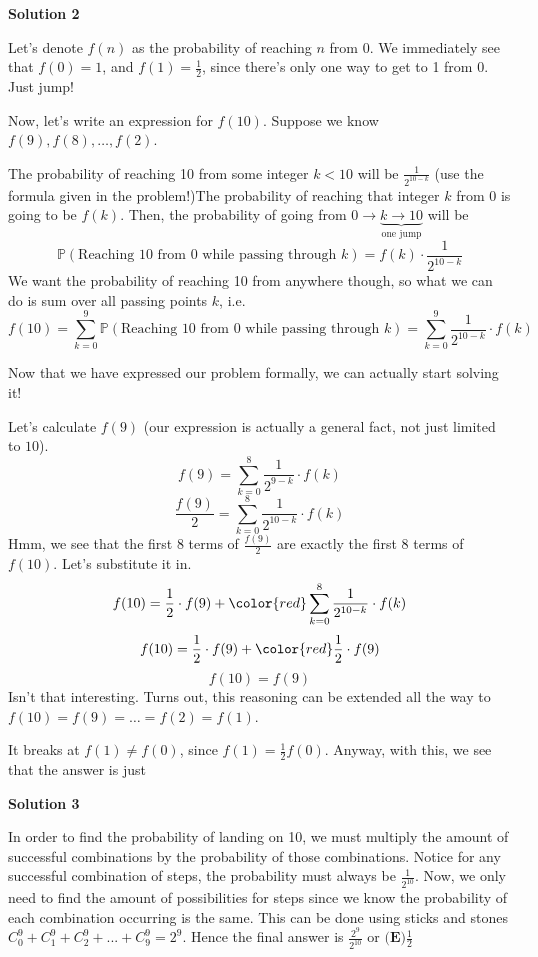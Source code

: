 \begin{enumerate}
 



\textbf{Solution 2}

Let's denote $f(n)$ as the probability of reaching $n$ from $0$. We immediately see that $f(0) = 1$, and $f(1) = \frac{1}{2}$, since there's only one way to get to 1 from 0. Just jump!

 Now, let's write an expression for $f(10)$. Suppose we know $f(9),f(8),\dotsc,f(2)$.  

 The probability of reaching 10 from some integer $k < 10$ will be $\frac{1}{2^{10-k}}$ (use the formula given in the problem!)The probability of reaching that integer $k$ from $0$ is going to be $f(k)$. Then, the probability of going from $0 \to \underbrace{ k \to 10}_{\text{one jump}}$ will be 
 \[\mathbb{P}(\text{Reaching } 10 \text{ from } 0 \text { while passing through } k) = f(k) \cdot \frac{1}{2^{10-k}}\] We want the probability of reaching 10 from anywhere though, so what we can do is sum over all passing points $k$, i.e.
 \[f(10) = \sum_{k=0}^9 \mathbb{P}(\text{Reaching } 10 \text{ from } 0 \text { while passing through } k) = \sum_{k=0}^9 \frac{1}{2^{10-k}} \cdot f(k)\]

 Now that we have expressed our problem formally, we can actually start solving it!

 Let's calculate $f(9)$ (our expression is actually a general fact, not just limited to $10$).
 \[f(9) = \sum_{k=0}^8 \frac{1}{2^{9-k}} \cdot f(k)\]
 \[\frac{f(9)}{2} = \sum_{k=0}^8 \frac{1}{2^{10-k}} \cdot f(k)\]Hmm, we see that the first 8 terms of $\frac{f(9)}{2}$ are exactly the first 8 terms of $f(10)$. Let's substitute it in.
 \[f(10) = \frac{1}{2} \cdot f(9) + \color{red} \sum_{k=0}^8 \frac{1}{2^{10-k}} \cdot f(k)\]
 \[f(10) = \frac{1}{2} \cdot f(9) + \color{red} \frac{1}{2} \cdot f(9)\]
 \[f(10) = f(9)\]Isn't that interesting. Turns out, this reasoning can be extended all the way to $f(10) = f(9) = \dotsc = f(2) = f(1)$.   

 
It breaks at $f(1) \neq f(0)$, since $f(1) = \frac{1}{2} f(0)$. Anyway, with this, we see that the answer is just 

 



\textbf{Solution 3}

In order to find the probability of landing on 10, we must multiply the amount of successful combinations by the probability of those combinations. Notice for any successful combination of steps, the probability must always be $\frac{1}{2^{10}}$. Now, we only need to find the amount of possibilities for steps since we know the probability of each combination occurring is the same. This can be done using sticks and stones $C_{0}^{9}+C_{1}^{9}+C_{2}^{9}+...+C_{9}^{9} = 2^9$. Hence the final answer is $\frac{2^{9}}{2^{10}}$ or $\boxed{\textbf{(E)} \frac{1}{2}}$


\end{enumerate}
